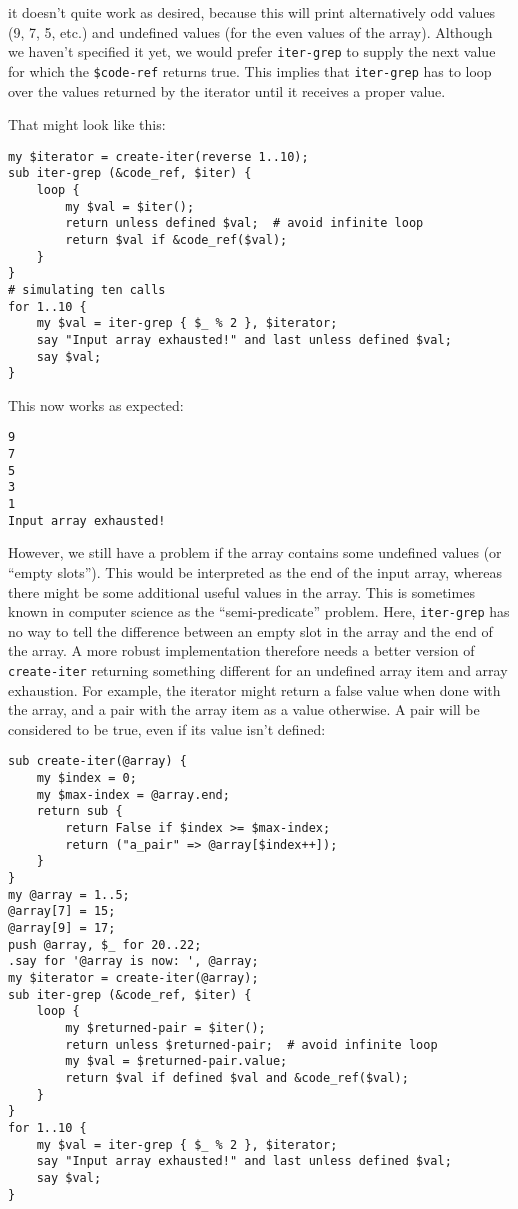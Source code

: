 it doesn't quite work as desired, because this will print 
alternatively odd values (9, 7, 5, etc.) and undefined 
values (for the even values of the array). Although we 
haven't specified it yet, we would prefer {\tt iter-grep} 
to supply the next value for which the \verb'$code-ref' 
returns true. This implies that {\tt iter-grep} has to 
loop over the values returned by the iterator until it 
receives a proper value.

That might look like this:

\begin{verbatim}
my $iterator = create-iter(reverse 1..10);
sub iter-grep (&code_ref, $iter) {
    loop {
        my $val = $iter();
        return unless defined $val;  # avoid infinite loop
        return $val if &code_ref($val);
	}
}
# simulating ten calls
for 1..10 {
    my $val = iter-grep { $_ % 2 }, $iterator;
    say "Input array exhausted!" and last unless defined $val;
    say $val;
}
\end{verbatim}

This now works as expected:

\begin{verbatim}
9
7
5
3
1
Input array exhausted!
\end{verbatim}

However, we still have a problem if the array 
contains some undefined values (or ``empty slots''). This 
would be interpreted as the end of the input array, whereas 
there might be some additional useful values in the array. 
This is sometimes known in computer science as the 
``semi-predicate'' problem. Here, {\tt iter-grep} has no 
way to tell the difference between an empty slot in the array 
and the end of the array. A more robust implementation 
therefore needs a better version of {\tt create-iter}  
returning something different for an undefined array item 
and array exhaustion. For example, the iterator might return 
a false value when done with the array, and a pair with the 
array item as a value otherwise. A pair will be considered 
to be true, even if its value isn't defined:

\begin{verbatim}
sub create-iter(@array) {
    my $index = 0;
    my $max-index = @array.end;
    return sub { 
        return False if $index >= $max-index; 
        return ("a_pair" => @array[$index++]);
    }
}
my @array = 1..5;
@array[7] = 15;
@array[9] = 17;
push @array, $_ for 20..22;
.say for '@array is now: ', @array;
my $iterator = create-iter(@array);
sub iter-grep (&code_ref, $iter) {
    loop {
        my $returned-pair = $iter();
        return unless $returned-pair;  # avoid infinite loop
        my $val = $returned-pair.value;
        return $val if defined $val and &code_ref($val);
	}
}
for 1..10 {
    my $val = iter-grep { $_ % 2 }, $iterator;
    say "Input array exhausted!" and last unless defined $val;
    say $val;
}
\end{verbatim}

